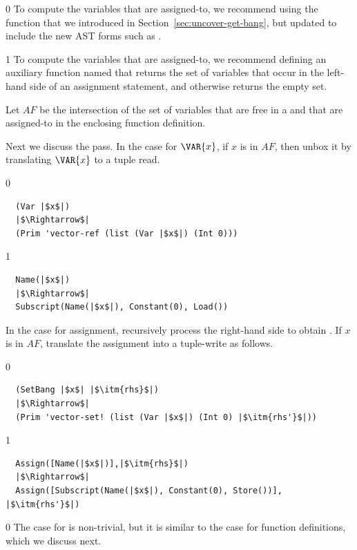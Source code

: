 \documentclass[7x10,nocrop]{TimesAPriori_MIT}%
\def\racketEd{0}
\def\pythonEd{1}
\def\edition{1}
\begin{document}
{\if\edition\racketEd
%
To compute the variables that are assigned-to, we recommend using the
 function that we introduced in
Section~\ref{sec:uncover-get-bang}, but updated to include the new AST
forms such as .
%
\fi}
  
{\if\edition\pythonEd
%
To compute the variables that are assigned-to, we recommend defining
an auxiliary function named  that returns
the set of variables that occur in the left-hand side of an assignment
statement, and otherwise returns the empty set.
%
\fi}

Let $\mathit{AF}$ be the intersection of the set of variables that are
free in a  and that are assigned-to in the enclosing
function definition.

Next we discuss the  pass.  In the case for
$\VAR{x}$, if $x$ is in $\mathit{AF}$, then unbox it by translating
$\VAR{x}$ to a tuple read.
%
{\if\edition\racketEd
\begin{lstlisting}
  (Var |$x$|)
  |$\Rightarrow$|
  (Prim 'vector-ref (list (Var |$x$|) (Int 0)))
\end{lstlisting}
\fi}
%
{\if\edition\pythonEd
\begin{lstlisting}
  Name(|$x$|)
  |$\Rightarrow$|
  Subscript(Name(|$x$|), Constant(0), Load())
\end{lstlisting}
\fi}
%
%
In the case for assignment, recursively process the right-hand side
 to obtain .  If $x$ is in $\mathit{AF}$, translate
the assignment into a tuple-write as follows.
%
{\if\edition\racketEd
\begin{lstlisting}
  (SetBang |$x$| |$\itm{rhs}$|)
  |$\Rightarrow$|
  (Prim 'vector-set! (list (Var |$x$|) (Int 0) |$\itm{rhs'}$|))
\end{lstlisting}
\fi}
{\if\edition\pythonEd
\begin{lstlisting}
  Assign([Name(|$x$|)],|$\itm{rhs}$|)
  |$\Rightarrow$|
  Assign([Subscript(Name(|$x$|), Constant(0), Store())], |$\itm{rhs'}$|)
\end{lstlisting}
\fi}
%
{\if\edition\racketEd
The case for  is non-trivial, but it is similar to the
case for function definitions, which we discuss next.
\fi}
\end{document}
